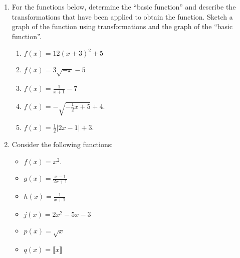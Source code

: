 \documentclass{ximera}
\begin{document}
\begin{enumerate}
\item For the functions below, determine the ``basic function'' and describe the transformations that have been applied to obtain the function. Sketch a graph of the function using transformations and the graph of the ``basic function''.
\begin{enumerate}
\item $f(x)=12(x+3)^2+5$
\item $f(x)=3\sqrt{-x}-5$
\item $f(x)=\frac{1}{x+1}-7$
\item $f(x)=-\sqrt{-\frac{1}{2}x+5}+4$.
\item $\displaystyle f(x)=\frac{1}{2}|2x-1|+3$.
\end{enumerate}


\item Consider the following functions:

\begin{itemize}
\item $f(x)=x^2$.
\item $\displaystyle g(x)=\frac{x-1}{2x+1}$
\item $\displaystyle h(x)=\frac{1}{x+1}$
\item $j(x) = 2x^2-5x-3$
\item $p(x)= \sqrt{x}$
\item $q(x)= \llbracket{x}\rrbracket$
\end{itemize}


\end{enumerate}
\end{document}
